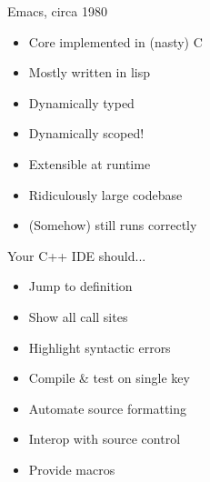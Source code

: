 \documentclass[20pt]{beamer}
\begin{document}
{
  \begin{frame}[plain]
  \end{frame}
}

\begin{frame}{Emacs, circa 1980}
  \begin{itemize}
  \item Core implemented in (nasty) C
  \item Mostly written in lisp
  \item Dynamically typed
  \item Dynamically scoped!
  \item Extensible at runtime
  \item Ridiculously large codebase
  \item (Somehow) still runs correctly
  \end{itemize}
\end{frame}

\begin{frame}{Your C++ IDE should...}
  \begin{itemize}
  \item Jump to definition
  \item Show all call sites
  \item Highlight syntactic errors
  \item Compile \& test on single key
  \item Automate source formatting
  \item Interop with source control
  \item Provide macros
  \end{itemize}
\end{frame}

\begin{frame}
  \titlepage
\end{frame}
\end{document}
